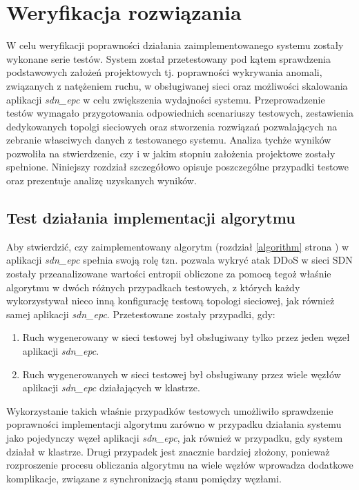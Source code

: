 \chapter{Weryfikacja rozwiązania}

W celu weryfikacji poprawności działania zaimplementowanego systemu zostały
wykonane serie testów. System został przetestowany pod kątem sprawdzenia
podstawowych założeń projektowych tj. poprawności wykrywania anomali, związanych
z natężeniem ruchu, w obsługiwanej sieci oraz możliwości skalowania
aplikacji \textit{sdn\_epc} w celu zwiększenia wydajności systemu.
Przeprowadzenie testów wymagało przygotowania odpowiednich scenariuszy testowych,
zestawienia dedykowanych topolgi sieciowych oraz stworzenia rozwiązań
pozwalających na zebranie własciwych danych z testowanego systemu. Analiza
tychże wyników pozwoliła na stwierdzenie, czy i w jakim stopniu założenia
projektowe zostały spełnione. Niniejszy rozdział szczegółowo opisuje
poszczególne przypadki testowe oraz prezentuje analizę uzyskanych wyników.

\section{Test działania implementacji algorytmu}

 
Aby stwierdzić, czy zaimplementowany algorytm (rozdział \ref{algorithm} strona
\pageref{algorithm}) w aplikacji \textit{sdn\_epc} spełnia swoją rolę tzn.
pozwala wykryć atak DDoS w sieci SDN zostały przeanalizowane wartości entropii
obliczone za pomocą tegoż właśnie algorytmu w dwóch różnych przypadkach
testowych, z których każdy wykorzystywał nieco inną konfigurację testową
topologi sieciowej, jak również samej aplikacji \textit{sdn\_epc}. Przetestowane
zostały przypadki, gdy:  
\begin{enumerate}
  \item Ruch wygenerowany w sieci testowej był obsługiwany tylko przez jeden
    węzeł aplikacji \textit{sdn\_epc}.
  \item Ruch wygenerowanych w sieci testowej był obsługiwany przez wiele węzłów
    aplikacji \textit{sdn\_epc} działających w klastrze.
\end{enumerate}
Wykorzystanie takich właśnie przypadków testowych umożliwiło sprawdzenie
poprawności implementacji algorytmu zarówno w przypadku działania systemu jako
pojedynczy węzeł aplikacji \textit{sdn\_epc}, jak również w przypadku, gdy
system działał w klastrze. Drugi przypadek jest znacznie bardziej złożony,
ponieważ rozproszenie procesu obliczania algorytmu na wiele węzłów wprowadza
dodatkowe komplikacje, związane z synchronizacją stanu pomiędzy węzłami.

